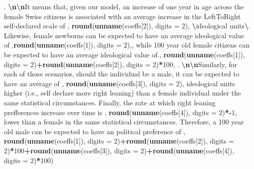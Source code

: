 \documentclass[
]{book}
\newenvironment{Shaded}{\begin{snugshade}}{\end{snugshade}}
\newcommand{\AttributeTok}[1]{\textcolor[rgb]{0.13,0.29,0.53}{#1}}
\newcommand{\DecValTok}[1]{\textcolor[rgb]{0.00,0.00,0.81}{#1}}
\newcommand{\FunctionTok}[1]{\textcolor[rgb]{0.13,0.29,0.53}{\textbf{#1}}}
\newcommand{\NormalTok}[1]{#1}
\newcommand{\SpecialCharTok}[1]{\textcolor[rgb]{0.81,0.36,0.00}{\textbf{#1}}}
\newcommand{\StringTok}[1]{\textcolor[rgb]{0.31,0.60,0.02}{#1}}
\begin{document}
\begin{Shaded}
\begin{Highlighting}[]
\StringTok{\textquotesingle{}. }\SpecialCharTok{\textbackslash{}n\textbackslash{}n}\StringTok{It means that, given our model,  an increase of one year in age across the female Swiss citizens is associated with an average increase in the LeftToRight self{-}declared scale of \textquotesingle{}}\NormalTok{, }\FunctionTok{round}\NormalTok{(}\FunctionTok{unname}\NormalTok{(coeffs[}\DecValTok{2}\NormalTok{]), }\AttributeTok{digits =} \DecValTok{2}\NormalTok{), }\StringTok{\textquotesingle{} }\SpecialCharTok{\textbackslash{}\textquotesingle{}}\StringTok{ideological units}\SpecialCharTok{\textbackslash{}\textquotesingle{}}\StringTok{. Likewise, female newborns can be expected to have an average ideological value of \textquotesingle{}}\NormalTok{,}\FunctionTok{round}\NormalTok{(}\FunctionTok{unname}\NormalTok{(coeffs[}\DecValTok{1}\NormalTok{]), }\AttributeTok{digits =} \DecValTok{2}\NormalTok{),}\StringTok{\textquotesingle{}, while 100 year old female citizens can be expected to have an average ideological value of.\textquotesingle{}}\NormalTok{, }\FunctionTok{round}\NormalTok{(}\FunctionTok{unname}\NormalTok{(coeffs[}\DecValTok{1}\NormalTok{]), }\AttributeTok{digits =} \DecValTok{2}\NormalTok{)}\SpecialCharTok{+}\FunctionTok{round}\NormalTok{(}\FunctionTok{unname}\NormalTok{(coeffs[}\DecValTok{2}\NormalTok{]), }\AttributeTok{digits =} \DecValTok{2}\NormalTok{)}\SpecialCharTok{*}\DecValTok{100}\NormalTok{, }\StringTok{\textquotesingle{}. }\SpecialCharTok{\textbackslash{}n\textbackslash{}n}\StringTok{Similarly, for each of those scenarios, should the individual be a male, it can be expected to have an average of \textquotesingle{}}\NormalTok{, }\FunctionTok{round}\NormalTok{(}\FunctionTok{unname}\NormalTok{(coeffs[}\DecValTok{3}\NormalTok{]), }\AttributeTok{digits =} \DecValTok{2}\NormalTok{), }\StringTok{\textquotesingle{} ideological units higher (i.e., self declare more right leaning) than a female individual under the same statistical circumstances. Finally, the rate at which right leaning prefferences increase over time is \textquotesingle{}}\NormalTok{, }\FunctionTok{round}\NormalTok{(}\FunctionTok{unname}\NormalTok{(coeffs[}\DecValTok{4}\NormalTok{]), }\AttributeTok{digits =} \DecValTok{2}\NormalTok{)}\SpecialCharTok{*{-}}\DecValTok{1}\NormalTok{, }\StringTok{\textquotesingle{} lower than a female in the same statistical circumstances. Therefore, a 100 year old male can be expected to have an political preference of \textquotesingle{}}\NormalTok{, }\FunctionTok{round}\NormalTok{(}\FunctionTok{unname}\NormalTok{(coeffs[}\DecValTok{1}\NormalTok{]), }\AttributeTok{digits =} \DecValTok{2}\NormalTok{)}\SpecialCharTok{+}\FunctionTok{round}\NormalTok{(}\FunctionTok{unname}\NormalTok{(coeffs[}\DecValTok{2}\NormalTok{]), }\AttributeTok{digits =} \DecValTok{2}\NormalTok{)}\SpecialCharTok{*}\DecValTok{100}\SpecialCharTok{+}\FunctionTok{round}\NormalTok{(}\FunctionTok{unname}\NormalTok{(coeffs[}\DecValTok{3}\NormalTok{]), }\AttributeTok{digits =} \DecValTok{2}\NormalTok{)}\SpecialCharTok{+}\FunctionTok{round}\NormalTok{(}\FunctionTok{unname}\NormalTok{(coeffs[}\DecValTok{4}\NormalTok{]), }\AttributeTok{digits =} \DecValTok{2}\NormalTok{)}\SpecialCharTok{*}\DecValTok{100}\NormalTok{)}

\end{Highlighting}
\end{Shaded}
\end{document}
